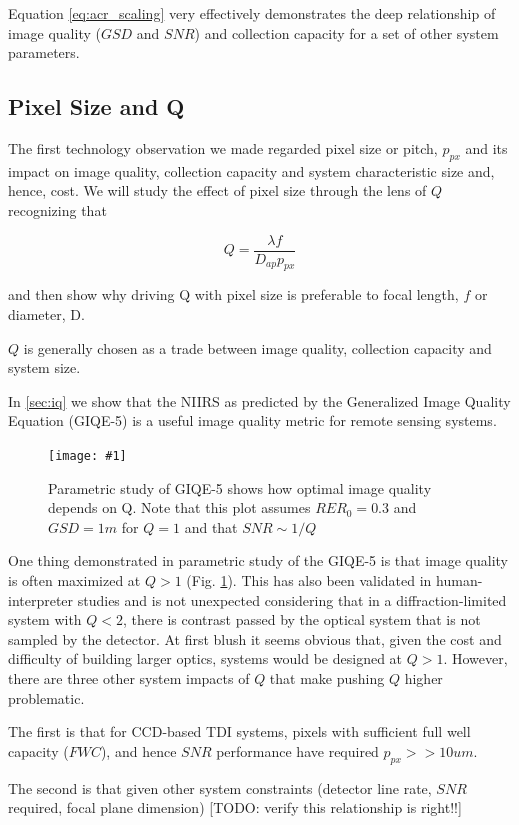 \documentclass[10pt,journal]{IEEEtran}  %
\newcommand{\includefigure}[3]
{
  \begin{figure}[h!]
  \centering
  \texttt{[image: \#1]}
  \caption[]{#3}
  \label{#2}
  \end{figure}
}
\begin{document}
Equation \ref{eq:acr_scaling} very effectively demonstrates the deep relationship of image quality ($GSD$ and $SNR$) and collection capacity for a set of other system parameters.

\subsection{Pixel Size and Q}

The first technology observation we made regarded pixel size or pitch, $p_{px}$ and its impact on image quality, collection capacity and system characteristic size and, hence, cost.  We will study the effect of pixel size through the lens of $Q$ recognizing that

$$Q = \frac{\lambda f}{D_{ap} p_{px}}$$

and then show why driving Q with pixel size is preferable to focal length, $f$ or diameter, D.

$Q$ is generally chosen as a trade between image quality, collection capacity and system size.  

In \ref{sec:iq} we show that the NIIRS as predicted by the Generalized Image Quality Equation (GIQE-5) is a useful image quality metric for remote sensing systems.

\includefigure{figures/Q_iq.pgf}{fig:q_iq}{Parametric study of GIQE-5 shows how optimal image quality depends on Q.  Note that this plot assumes $RER_0 = 0.3$ and $GSD = 1m$ for $Q=1$ and that $SNR \sim 1 / Q$}

One thing demonstrated in parametric study of the GIQE-5 is that image quality is often maximized at $Q>1$ (Fig. \ref{fig:q_iq}).  This has also been validated in human-interpreter studies \cite{fiete_Q_IQ} and is not unexpected considering that in a diffraction-limited system with $Q<2$, there is contrast passed by the optical system that is not sampled by the detector.  At first blush it seems obvious that, given the cost and difficulty of building larger optics, systems would be designed at $Q>1$.  However, there are three other system impacts of $Q$ that make pushing $Q$ higher problematic.

The first is that for CCD-based TDI systems, pixels with sufficient full well capacity ($FWC$), and hence $SNR$ performance have required $p_{px} >> 10um$.

The second is that given other system constraints (detector line rate, $SNR$ required, focal plane dimension) [TODO: verify this relationship is right!!]
\end{document}

